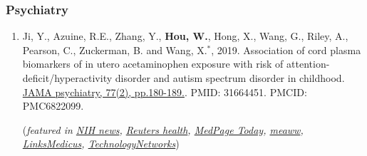 \documentclass[10pt,letterpaper]{article}
\begin{document}
\subsubsection*{Psychiatry}
\begin{enumerate}
\item Ji, Y., Azuine, R.E., Zhang, Y., {\bf Hou, W.}, Hong, X., Wang, G., Riley, A., Pearson, C., Zuckerman, B. and Wang, X.$^{\ast}$, 2019. Association of cord plasma biomarkers of in utero acetaminophen exposure with risk of attention-deficit/hyperactivity disorder and autism spectrum disorder in childhood. \href{https://jamanetwork.com/journals/jamapsychiatry/article-abstract/2753512}{JAMA psychiatry, 77(2), pp.180-189.}. PMID: 31664451. PMCID: PMC6822099.

({\it featured in  \href{https://www.nih.gov/news-events/news-releases/nih-funded-study-suggests-acetaminophen-exposure-pregnancy-linked-higher-risk-adhd-autism}{NIH news},
\href{https://www.reuters.com/article/us-health-pregnancy-acetaminophen/babies-at-higher-risk-for-adhd-autism-if-pregnant-moms-took-acetaminophen-idUSKBN1X920J?fbclid=IwAR3T4phyb6Fu4F9zQVNL4EWgET04m4ITHD6S1R8eZkvj2j3TBIPJZSpYqf0}{Reuters health},
\href{https://www.medpagetoday.com/obgyn/pregnancy/83040}{MedPage Today},
\href{https://meaww.com/taking-pain-relief-drug-acetaminophen-pregnancy-risk-autism-adhd-study}{meaww},
\href{https://linksmedicus.com/news/study-utero-acetaminophen-exposure-linked-increased-risk-adhd-autism-spectrum-disorder-childhood/}{LinksMedicus},
\href{https://www.technologynetworks.com/drug-discovery/news/paracetamol-during-pregnancy-could-be-linked-to-increased-risk-of-adhd-and-autism-326647}{TechnologyNetworks}}) 
\end{enumerate}
\end{document}

